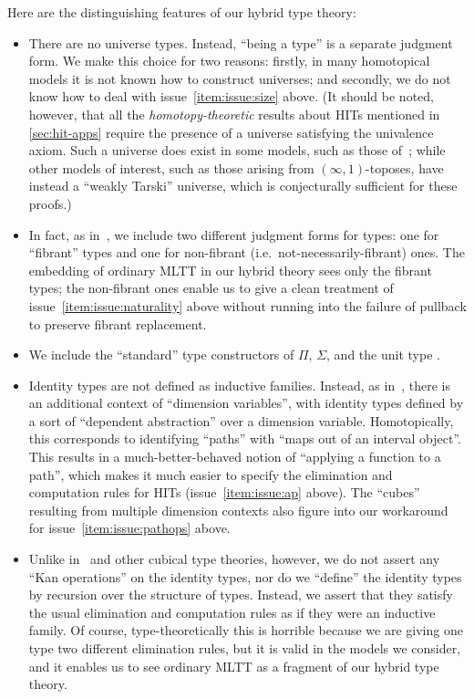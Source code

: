 \documentclass{amsart}
\begin{document}
Here are the distinguishing features of our hybrid type theory:
\begin{itemize}
\item There are no universe types.
  Instead, ``being a type'' is a separate judgment form.
  We make this choice for two reasons: firstly, in many homotopical models it is not known how to construct universes; and secondly, we do not know how to deal with issue~\ref{item:issue:size} above.
  (It should be noted, however, that all the \emph{homotopy-theoretic} results about HITs mentioned in \cref{sec:hit-apps} require the presence of a universe satisfying the univalence axiom.
  Such a universe does exist in some models, such as those of~\cite{klv:ssetmodel,shulman:invdia,shulman:elreedy}; while other models of interest, such as those arising from $(\infty,1)$-toposes, have instead a ``weakly Tarski'' universe, which is conjecturally sufficient for these proofs.)
\item In fact, as in~\cite{vv:hts}, we include two different judgment forms for types: one for ``fibrant'' types and one for non-fibrant (i.e.\ not-necessarily-fibrant) ones.
  The embedding of ordinary MLTT in our hybrid theory sees only the fibrant types; the non-fibrant ones enable us to give a clean treatment of issue~\ref{item:issue:naturality} above without running into the failure of pullback to preserve fibrant replacement.
\item We include the ``standard'' type constructors of $\Pi$, $\Sigma$, and the unit type \unittype.
\item Identity types are not defined as inductive families.
  Instead, as in~\cite{lb:cubical-tt}, there is an additional context of ``dimension variables'', with identity types defined by a sort of ``dependent abstraction'' over a dimension variable.
  Homotopically, this corresponds to identifying ``paths'' with ``maps out of an interval object''.
  This results in a much-better-behaved notion of ``applying a function to a path'', which makes it much easier to specify the elimination and computation rules for HITs (issue~\ref{item:issue:ap} above).
  The ``cubes'' resulting from multiple dimension contexts also figure into our workaround for issue~\ref{item:issue:pathops} above.
\item Unlike in~\cite{lb:cubical-tt} and other cubical type theories, however, we do not assert any ``Kan operations'' on the identity types, nor do we ``define'' the identity types by recursion over the structure of types.
  Instead, we assert that they satisfy the usual elimination and computation rules as if they were an inductive family.
  Of course, type-theoretically this is horrible because we are giving one type two different elimination rules, but it is valid in the models we consider, and it enables us to see ordinary MLTT as a fragment of our hybrid type theory.
\end{itemize}
\end{document}
